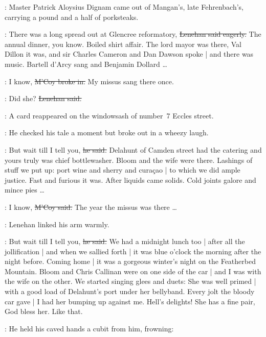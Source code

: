 \begin{interject}
    :
    Master Patrick Aloysius Dignam came out of Mangan's,
    late Fehrenbach's,
    carrying a pound and a half of porksteaks.
\end{interject}

\lenehan:
There was a long spread out at Glencree reformatory,
\sout{Lenehan said eagerly.}
The annual dinner, you know.
Boiled shirt affair.
The lord mayor was there,
Val Dillon it was,
and sir Charles Cameron and Dan Dawson spoke |
and there was music.
Bartell d'Arcy sang and Benjamin Dollard \ldots

\mcoy:
I know,
\sout{M'Coy broke in.}%
My missus sang there once.

\lenehan:
Did she?
\sout{Lenehan said.}

\begin{interject}
    :
    A card  reappeared
    on the windowsash of number~7 Eccles street.
\end{interject}

:
He checked his tale a moment
but broke out in a wheezy laugh.

\lenehan:
But wait till I tell you,
\sout{he said.}
Delahunt of Camden street had the catering
and yours truly was chief bottlewasher.
Bloom and the wife were there.
Lashings of stuff we put up:
port wine and sherry and curaçao |
to which we did ample justice.
Fast and furious it was.
After liquids came solids.
Cold joints galore and mince pies \ldots

\mcoy:
I know,
\sout{M'Coy said.}%
The year the missus was there \ldots

:
Lenehan linked his arm warmly.

\lenehan:
But wait till I tell you,
\sout{he said.}
We had a midnight lunch too |
after all the jollification |
and when we sallied forth |
it was blue o'clock the morning after the night before.
Coming home |
it was a gorgeous winter's night on the Featherbed Mountain.
Bloom and Chris Callinan were on one side of the car |
and I was with the wife on the other.
We started singing glees and duets:
She was well primed |
with a good load of Delahunt's port under her bellyband.
Every jolt the bloody car gave |
I had her bumping up against me.
Hell's delights!
She has a fine pair, God bless her.%
Like that.

:
He held his caved hands a cubit from him,
frowning:

